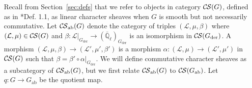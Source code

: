 \documentclass[10pt]{amsart}
\theoremstyle{plain}
\theoremstyle{definition}
\newcommand{\EE}{\mathbb{\bar Q}_\ell}
\newcommand{\der}{_{\operatorname{der}}}
\newcommand{\ab}{_{\operatorname{ab}}}
\newcommand{\ceq}{{\, :=\, }}
\newcommand{\cs}[1]{{\mathcal{#1}}}
\newcommand{\CS}{{\mathcal{C\hskip-0.8pt S}}}
\newcommand{\CSab}{\CS_{\operatorname{ab}}}
\begin{document}
Recall from Section~\ref{sec:defs} that we refer to objects in category $\CS(G)$, defined as
in \cite{cunningham-roe:13a}*{Def. 1.1}, as linear character sheaves when $G$ is smooth but
not necessarily commutative.
Let $\CSab(G)$ denote the category of triples $(\cs{L},\mu,\beta)$ where $(\cs{L},\mu) \in \CS(G)$ and
$\beta : \cs{L}\vert_{G\der} \to (\EE)_{G\der}$ is an isomorphism in $\CS(G\der)$.
A morphism $(\cs{L},\mu,\beta)\to (\cs{L}',\mu',\beta')$ is a morphism $\alpha : (\cs{L},\mu)\to (\cs{L}',\mu')$
in $\CS(G)$ such that $\beta = \beta' \circ \alpha\vert_{G\der}$.  We will define commutative character sheaves
as a subcategory of $\CSab(G)$, but we first relate $\CSab(G)$ to $\CS(G\ab)$.  Let $q : G \to G\ab$ be the quotient map.
\end{document}
